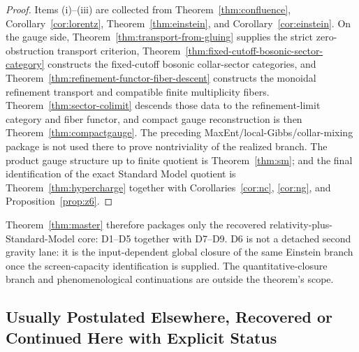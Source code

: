 \documentclass[11pt]{article}
\begin{document}
\begin{proof}
Items (i)--(iii) are collected from Theorem~\ref{thm:confluence}, Corollary~\ref{cor:lorentz}, Theorem~\ref{thm:einstein}, and Corollary~\ref{cor:einstein}. On the gauge side, Theorem~\ref{thm:transport-from-gluing} supplies the strict zero-obstruction transport criterion, Theorem~\ref{thm:fixed-cutoff-bosonic-sector-category} constructs the fixed-cutoff bosonic collar-sector categories, and Theorem~\ref{thm:refinement-functor-fiber-descent} constructs the monoidal refinement transport and compatible finite multiplicity fibers. Theorem~\ref{thm:sector-colimit} descends those data to the refinement-limit category and fiber functor, and compact gauge reconstruction is then Theorem~\ref{thm:compactgauge}. The preceding MaxEnt/local-Gibbs/collar-mixing package is not used there to prove nontriviality of the realized branch. The product gauge structure up to finite quotient is Theorem~\ref{thm:sm}; and the final identification of the exact Standard Model quotient is Theorem~\ref{thm:hypercharge} together with Corollaries~\ref{cor:nc}, \ref{cor:ng}, and Proposition~\ref{prop:z6}.
\end{proof}

Theorem~\ref{thm:master} therefore packages only the recovered relativity-plus-Standard-Model core: D1--D5 together with D7--D9. D6 is not a detached second gravity lane: it is the input-dependent global closure of the same Einstein branch once the screen-capacity identification is supplied. The quantitative-closure branch and phenomenological continuations are outside the theorem's scope.

\subsection*{Usually Postulated Elsewhere, Recovered or Continued Here with Explicit Status}
\end{document}
